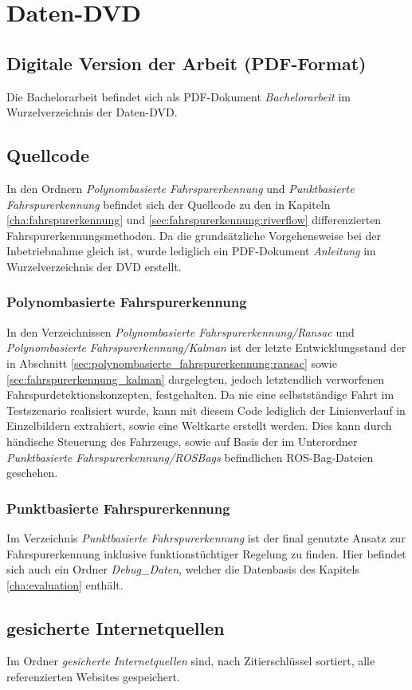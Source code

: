 \appendix
{} %
\newcommand{\fdname}[1]{\emph{#1}}
\chapter{Daten-DVD}	
\section{Digitale Version der Arbeit (PDF-Format)}
Die Bachelorarbeit befindet sich als PDF-Dokument \fdname{Bachelorarbeit} im Wurzelverzeichnis der Daten-DVD.

\section{Quellcode}
In den Ordnern \fdname{Polynombasierte Fahrspurerkennung} und \fdname{Punktbasierte Fahrspurerkennung} befindet sich der Quellcode zu den in Kapiteln \ref{cha:fahrspurerkennung} und \ref{sec:fahrspurerkennung:riverflow} differenzierten Fahrspurerkennungsmethoden. Da die grundsätzliche Vorgehensweise bei der Inbetriebnahme gleich ist, wurde lediglich ein PDF-Dokument \fdname{Anleitung} im Wurzelverzeichnis der DVD erstellt.

\subsection{Polynombasierte Fahrspurerkennung}
In den Verzeichnissen \fdname{Polynombasierte Fahrspurerkennung/Ransac} und \fdname{Polynombasierte Fahrspurerkennung/Kalman} ist der letzte Entwicklungsstand der in Abschnitt \ref{sec:polynombasierte_fahrspurerkennung:ransac} sowie \ref{sec:fahrspurerkennung_kalman} dargelegten, jedoch letztendlich verworfenen Fahrspurdetektionskonzepten, festgehalten. Da nie eine selbstständige Fahrt im Testszenario realisiert wurde, kann mit diesem Code lediglich der Linienverlauf in Einzelbildern extrahiert, sowie eine Weltkarte erstellt werden. Dies kann durch händische Steuerung des Fahrzeugs, sowie auf Basis der im Unterordner \fdname{Punktbasierte Fahrspurerkennung/ROSBags} befindlichen
ROS-Bag-Dateien geschehen.

\subsection{Punktbasierte Fahrspurerkennung}
\label{anhang:quellcode:punktbasierte}
Im Verzeichnis \fdname{Punktbasierte Fahrspurerkennung} ist der final genutzte Ansatz zur Fahrspurerkennung inklusive funktionstüchtiger Regelung zu finden. Hier befindet sich auch ein Ordner \fdname{Debug\_Daten}, welcher die Datenbasis des Kapitels \ref{cha:evaluation} enthält.

\section{gesicherte Internetquellen}
Im Ordner \fdname{gesicherte Internetquellen} sind, nach Zitierschlüssel sortiert, alle referenzierten Websites gespeichert.
